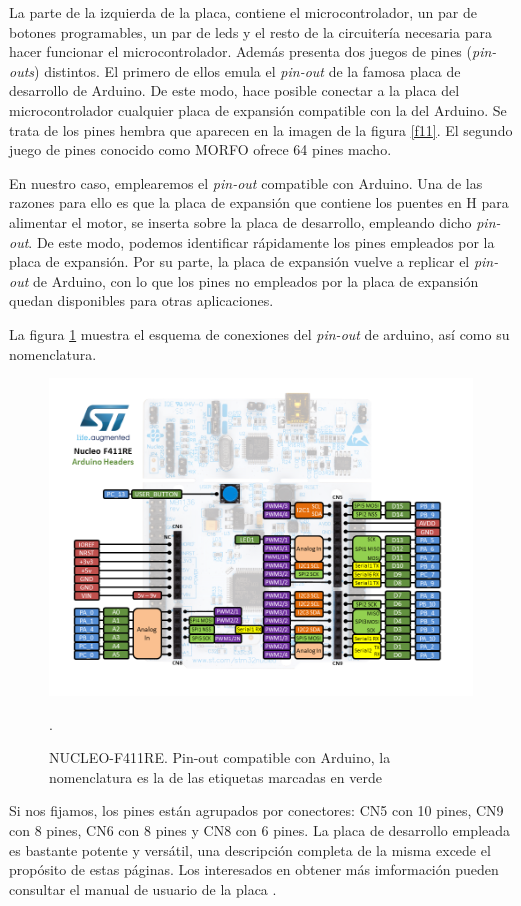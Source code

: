 \documentclass[10pt,a4paper]{report}
\begin{document}
La parte de la izquierda de la placa, contiene el microcontrolador, un par de botones programables, un par de leds y el resto de la circuitería necesaria para hacer funcionar el microcontrolador. Además presenta dos juegos de pines (\emph{pin-outs}) distintos. El primero de ellos emula el \emph{pin-out} de la famosa placa de desarrollo de  Arduino. De este modo, hace posible conectar a la placa del microcontrolador cualquier placa de expansión compatible con la del Arduino. Se trata de los pines hembra que aparecen en la imagen de la figura \ref{f11}. El segundo juego de pines conocido como MORFO ofrece 64 pines macho.

En nuestro caso, emplearemos el \emph{pin-out} compatible con Arduino. Una de las razones para ello es que la placa de expansión que contiene los puentes en H para alimentar el motor, se inserta sobre  la placa de desarrollo, empleando dicho \emph{pin-out}. De este modo, podemos identificar rápidamente los pines empleados por la placa de expansión. Por su parte, la placa de expansión vuelve a replicar el \emph{pin-out} de Arduino, con lo que los pines no empleados por la placa de expansión quedan disponibles para otras aplicaciones.

La figura \ref{f12} muestra el esquema de conexiones del \emph{pin-out} de arduino, así como su nomenclatura.
\begin{figure}
\includegraphics[scale=0.9,angle=90]{nucleo_f411re_arduino.png}
\caption{NUCLEO-F411RE. Pin-out compatible con Arduino, la nomenclatura es la de las etiquetas marcadas en verde}.\label{f12}
\end{figure}
Si nos fijamos, los pines están agrupados por conectores: CN5 con 10 pines, CN9 con 8 pines, CN6 con 8 pines y CN8 con 6 pines.
La placa de desarrollo empleada es bastante potente y versátil, una descripción completa de la misma excede el propósito de estas páginas. Los interesados en obtener más imformación pueden consultar el manual de usuario de la placa \cite{STNUCLEO}.
\end{document}
